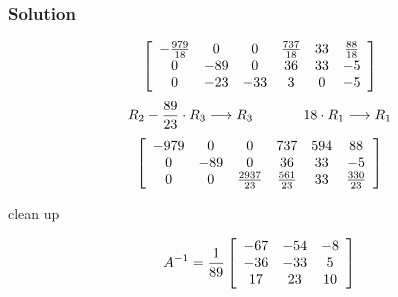 \documentclass[xcolor=dvipsnames]{beamer}
\begin{document}
\begin{frame}
  \frametitle{Solution}
  \begin{equation}
    \label{eq:aichohmi}
    \left[
      \begin{array}{cccccc}
        -\frac{979}{18} & 0  & 0 & \frac{737}{18} & 33 & \frac{88}{18} \\
         0 & -89 & 0  & 36 & 33 & -5 \\
        0 & -23  & -33  & 3 & 0 & -5
      \end{array}\right]\notag
  \end{equation}
  \begin{equation}
    \label{eq:opahyahs}
R_{2}-\frac{89}{23}\cdot{}R_{3}\longrightarrow{}R_{3}\hspace{.5in}18\cdot{}R_{1}\longrightarrow{}R_{1}\notag     
  \end{equation}
  \begin{equation}
    \label{eq:chahtiye}
    \left[
      \begin{array}{cccccc}
        -979 & 0  & 0 & 737 & 594 & 88 \\
         0 & -89 & 0  & 36 & 33 & -5 \\
        0 & 0  & \frac{2937}{23}  & \frac{561}{23} & 33 & \frac{330}{23}
      \end{array}\right]\notag
  \end{equation}
  \begin{center}
    clean up
  \end{center}
  \begin{equation}
    \label{eq:thuoxook}
    A^{-1}=\frac{1}{89}\left[
      \begin{array}{ccc}
     -67&-54&-8 \\
        -36&-33&5 \\
        17&23&10
      \end{array}\right]\notag
  \end{equation}
\end{frame}
\end{document}
